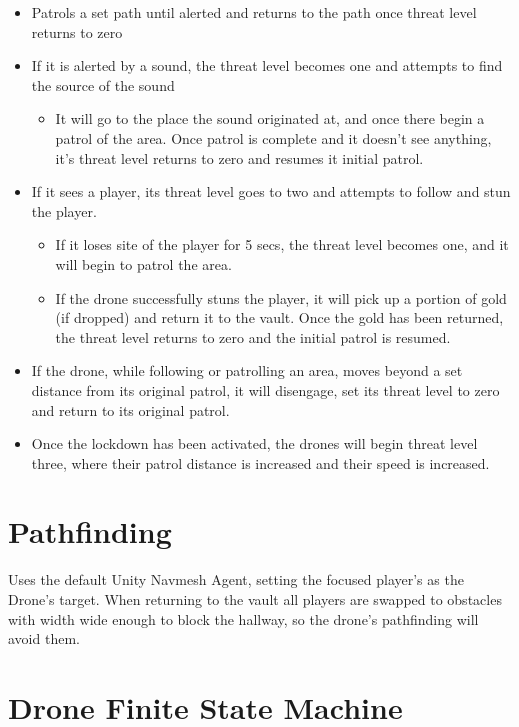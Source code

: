 \documentclass[14pt]{report}
\begin{document}
\begin{itemize}
    \item Patrols a set path until alerted and returns to the path once threat level returns to zero
    \item If it is alerted by a sound, the threat level becomes one and attempts to find the source of the sound
    \begin{itemize}
        \item It will go to the place the sound originated at, and once there begin a patrol of the area. Once patrol is complete and it doesn’t see anything, it’s threat level returns to zero and resumes it initial patrol.
    \end{itemize}
    \item If it sees a player, its threat level goes to two and attempts to follow and stun the player.
    \begin{itemize}
        \item If it loses site of the player for 5 secs, the threat level becomes one, and it will begin to patrol the area.
        \item If the drone successfully stuns the player, it will pick up a portion of gold (if dropped) and return it to the vault. Once the gold has been returned, the threat level returns to zero and the initial patrol is resumed.
    \end{itemize}
    \item If the drone, while following or patrolling an area, moves beyond a set distance from its original patrol, it will disengage, set its threat level to zero and return to its original patrol.
    \item Once the lockdown has been activated, the drones will begin threat level three, where their patrol distance is increased and their speed is increased.    
\end{itemize}

\section{Pathfinding}

Uses the default Unity Navmesh Agent, setting the focused player’s as the Drone’s target. When returning to the vault all players are swapped to obstacles with width wide enough to block the hallway, so the drone’s pathfinding will avoid them.

\section{Drone Finite State Machine}
\end{document}
